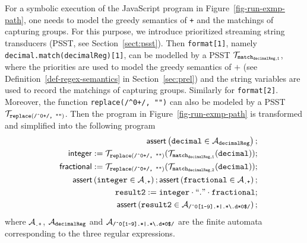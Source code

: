 For a symbolic execution of the JavaScript program in Figure~\ref{fig-run-exmp-path}, one needs to model the greedy semantics of {\tt +} and the matchings of capturing groups. For this purpose, we introduce prioritized streaming string transducers (PSST, see Section~\ref{sect:psst}). Then {\tt format[1]}, namely {\tt decimal.match(decimalReg)[1]}, can be modelled by a PSST $\mathcal{T}_{\tt match_{decimalReg,1}}$, where the priorities are used to model the greedy semantics of $+$ (see Definition~\ref{def-regex-semantics} in Section~\ref{sec:prel}) and the string variables are used to record the matchings of capturing groups. Similarly for  {\tt format[2]}. Moreover, the function {\tt replace(/\^{}0+/, "")} can also be modeled by a PSST $\mathcal{T}_{\scriptsize\tt replace(\mbox{\tt /\^{}0+/, ""})}$. Then the program in Figure~\ref{fig-run-exmp-path} is transformed and simplified into the following program
\begin{eqnarray}\label{eqn:exmp}
& & \textsf{assert}\left(\tt decimal \in \mathcal{A}_{decimalReg}\right);\nonumber \\
& & \sf integer  := \tt  \mathcal{T}_{\tt replace(\mbox{\scriptsize \tt /\^{}0+/, ""})}(\mathcal{T}_{\tt match_{decimalReg,1}}(decimal));\nonumber \\
& & \sf fractional  := \tt  \mathcal{T}_{\scriptsize\tt replace(\mbox{\tt /\^{}0+/, ""})}(\mathcal{T}_{\tt match_{decimalReg,2}}(decimal));\nonumber \\
&&  \textsf{assert}\left(\tt integer \in \mathcal{A}_{\scriptsize\mbox{\tt.+}}\right); 
\textsf{assert}\left(\tt fractional \in \mathcal{A}_{\scriptsize\mbox{\tt.+}}\right); \nonumber\\
 && \tt result2 := integer \cdot ``." \cdot fractional; \nonumber\\
 && \textsf{assert}\left(\tt result2 \in \mathcal{A}_{\scriptsize\mbox{\tt /\^{}0[1-9].*|.*{\scriptsize\textbackslash}.d*0\$/}}\right); 
\end{eqnarray}
where $\mathcal{A}_{\scriptsize\mbox{\tt.+}}$, $\mathcal{A}_{\tt decimalReg}$ and $\mathcal{A}_{\scriptsize\mbox{\tt /\^{}0[1-9].*|.*{\scriptsize\textbackslash}.d*0\$/}}$ are the finite automata corresponding to the three regular expressions.

